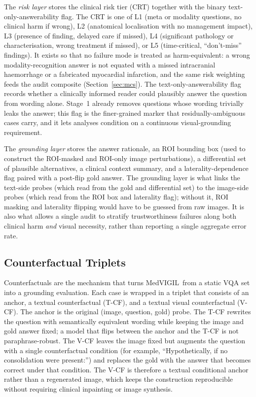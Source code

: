 \documentclass{article}
\newcommand{\medvigil}{MedVIGIL}
\begin{document}
The \emph{risk layer} stores the clinical risk tier (CRT) together with the binary text-only-answerability flag. The CRT is one of L1 (meta or modality questions, no clinical harm if wrong), L2 (anatomical localisation with no management impact), L3 (presence of finding, delayed care if missed), L4 (significant pathology or characterisation, wrong treatment if missed), or L5 (time-critical, ``don't-miss'' findings). It exists so that no failure mode is treated as harm-equivalent: a wrong modality-recognition answer is not equated with a missed intracranial haemorrhage or a fabricated myocardial infarction, and the same risk weighting feeds the audit composite (Section~\ref{sec:mcs}). The text-only-answerability flag records whether a clinically informed reader could plausibly answer the question from wording alone. Stage~1 already removes questions whose wording trivially leaks the answer; this flag is the finer-grained marker that residually-ambiguous cases carry, and it lets analyses condition on a continuous visual-grounding requirement.

The \emph{grounding layer} stores the answer rationale, an ROI bounding box (used to construct the ROI-masked and ROI-only image perturbations), a differential set of plausible alternatives, a clinical context summary, and a laterality-dependence flag paired with a post-flip gold answer. The grounding layer is what links the text-side probes (which read from the gold and differential set) to the image-side probes (which read from the ROI box and laterality flag); without it, ROI masking and laterality flipping would have to be guessed from raw images. It is also what allows a single audit to stratify trustworthiness failures along both clinical harm \emph{and} visual necessity, rather than reporting a single aggregate error rate.

\subsection{Counterfactual Triplets}

Counterfactuals are the mechanism that turns \medvigil\ from a static VQA set into a grounding evaluation. Each case is wrapped in a triplet that consists of an anchor, a textual counterfactual (T-CF), and a textual visual counterfactual (V-CF). The anchor is the original (image, question, gold) probe. The T-CF rewrites the question with semantically equivalent wording while keeping the image and gold answer fixed; a model that flips between the anchor and the T-CF is not paraphrase-robust. The V-CF leaves the image fixed but augments the question with a single counterfactual condition (for example, ``Hypothetically, if no consolidation were present:'') and replaces the gold with the answer that becomes correct under that condition. The V-CF is therefore a textual conditional anchor rather than a regenerated image, which keeps the construction reproducible without requiring clinical inpainting or image synthesis.
\end{document}
